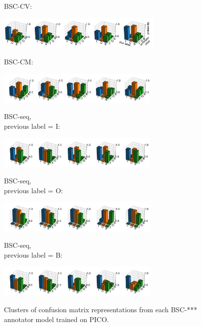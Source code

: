 \begin{figure}[h]
\begin{minipage}[b][1cm][l]{0.2\textwidth} 
BSC-CV:
\end{minipage}
  \includegraphics[width=0.72\textwidth, clip=True, trim=0 4 0 3]{figures/worker_models/vec} 
  \\
\begin{minipage}[b][1cm][l]{0.2\textwidth} 
BSC-CM:
\end{minipage}
  \includegraphics[width=0.7\textwidth, clip=True, trim=20 17 0 28]{figures/worker_models/ibcc}
 \\
\begin{minipage}[b][1cm][l]{0.2\textwidth} 
BSC-seq, \\
previous label = I:
\end{minipage}
  \includegraphics[width=0.7\textwidth, clip=True, trim=20 16 0 28]{figures/worker_models/seq_prev0}
\\
\begin{minipage}[b][1cm][l]{0.2\textwidth} 
BSC-seq, \\
previous label = O:
\end{minipage}
  \includegraphics[width=0.7\textwidth, clip=True, trim=20 16 0 28]{figures/worker_models/seq_prev1}
\\
\begin{minipage}[b][1cm][l]{0.2\textwidth} 
BSC-seq,\\
 previous label = B:
\end{minipage}
  \includegraphics[width=0.7\textwidth, clip=True, trim=20 17 0 28]{figures/worker_models/seq_prev2}
\\
\caption{Clusters of confusion matrix representations from each BSC-*** annotator model trained on PICO. 
}
\label{fig:conf_mat_clusters}
\end{figure}

